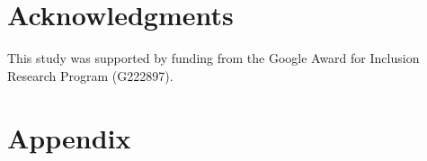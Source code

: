 \documentclass[11pt]{article}
\begin{document}
\section*{Acknowledgments}
This study was supported by funding from the Google Award for Inclusion Research Program (G222897).








































































































\appendix
\newpage
\section{Appendix}
\end{document}
